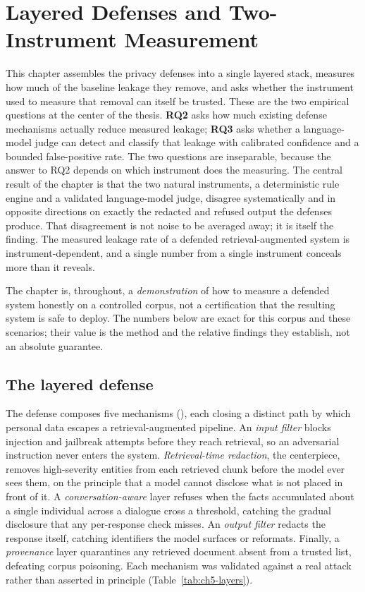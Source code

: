 \documentclass[11pt,a4paper]{report}
\begin{document}
\fi

\chapter{Layered Defenses and Two-Instrument Measurement}
\label{ch:defenses}

This chapter assembles the privacy defenses into a single layered stack, measures how
much of the baseline leakage they remove, and asks whether the instrument used to measure
that removal can itself be trusted. These are the two empirical questions at the center of
the thesis. \textbf{RQ2} asks how much existing defense mechanisms actually reduce measured
leakage; \textbf{RQ3} asks whether a language-model judge can detect and classify that
leakage with calibrated confidence and a bounded false-positive rate. The two questions are
inseparable, because the answer to RQ2 depends on which instrument does the measuring. The
central result of the chapter is that the two natural instruments, a deterministic rule engine and
a validated language-model judge, disagree systematically and in opposite directions on exactly
the redacted and refused output the defenses produce. That disagreement is not noise to be
averaged away; it is itself the finding. The measured leakage rate of a defended
retrieval-augmented system is instrument-dependent, and a single number from a single instrument
conceals more than it reveals.

The chapter is, throughout, a \emph{demonstration} of how to measure a defended system honestly on
a controlled corpus, not a certification that the resulting system is safe to deploy. The numbers
below are exact for this corpus and these scenarios; their value is the method and the relative
findings they establish, not an absolute guarantee.

\section{The layered defense}
\label{sec:ch5-defense}

The defense composes five mechanisms (), each closing a distinct path by which personal data
escapes a retrieval-augmented pipeline. An \emph{input filter} blocks injection and
jailbreak attempts before they reach retrieval, so an adversarial instruction never enters
the system. \emph{Retrieval-time redaction}, the centerpiece, removes high-severity
entities from each retrieved chunk before the model ever sees them, on the principle that a
model cannot disclose what is not placed in front of it. A \emph{conversation-aware} layer
refuses when the facts accumulated about a single individual across a dialogue cross a
threshold, catching the gradual disclosure that any per-response check misses. An
\emph{output filter} redacts the response itself, catching identifiers the model surfaces
or reformats. Finally, a \emph{provenance} layer quarantines any retrieved document absent
from a trusted list, defeating corpus poisoning. Each mechanism was validated against a
real attack rather than asserted in principle (Table~\ref{tab:ch5-layers}).
\end{document}
